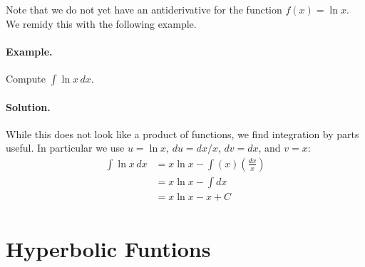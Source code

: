 \documentclass[12pt]{report}
\begin{document}
Note that we do not yet have an antiderivative for the function $f(x)=\ln x$. We remidy this with the following example.

\paragraph{Example.} Compute $\int \ln x\,dx$.

\paragraph{Solution.} While this does not look like a product of functions, we find integration by parts useful. In particular we use $u=\ln x$, $du=dx/x$, $dv=dx$, and $v=x$:
\begin{equation*}
\begin{split}
\int \ln x\,dx &=x\ln x-\int (x)\left(\frac{dx}x\right)\\
&=x\ln x-\int dx\\
&=x\ln x-x+C\\
\end{split}
\end{equation*}

\section{Hyperbolic Funtions}
\end{document}
